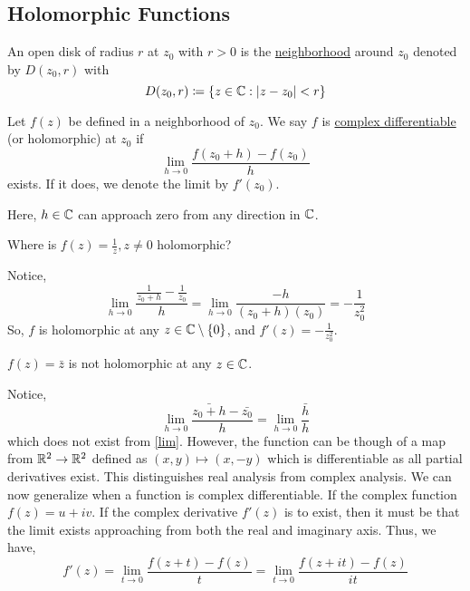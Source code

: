 \documentclass[11pt]{article}
\begin{document}
\subsection{Holomorphic Functions}
\begin{definition}
An open disk of radius $r$ at $z_0$ with $r>0$ is the \underline{neighborhood}
around $z_0$ denoted by $D(z_0, r)$ with
\begin{equation*}
D(z_0, r) \coloneqq \{z\in\mathbb{C}:|z-z_0|<r\}
\end{equation*}
\end{definition}
\begin{definition}
Let $f(z)$ be defined in a neighborhood of $z_0$. We say $f$ is
\underline{complex differentiable} (or holomorphic) at $z_0$ if
\begin{equation*}
\lim_{h\to 0} \frac{f(z_0+h) - f(z_0)}{h}
\end{equation*}
exists. If it does, we denote the limit by $f'(z_0)$.
\end{definition}
\begin{remark}
Here, $h\in\mathbb{C}$ can approach zero from any direction in $\mathbb{C}$.
\end{remark}
\begin{example}
Where is $f(z) = \frac{1}{z}, z \neq 0$ holomorphic?
\end{example}
Notice,
\begin{equation*}
\lim_{h\to 0} \frac{\frac{1}{z_0+h} - \frac{1}{z_0}}{h}
= \lim_{h\to 0} \frac{-h}{(z_0+h)(z_0)}
= -\frac{1}{z_0^2}
\end{equation*}
So, $f$ is holomorphic at any $z \in \mathbb{C} \setminus \{0\}$, and $f'(z) =
-\frac{1}{z_0^2}$.
\begin{example}
$f(z) = \bar z$ is not holomorphic at any $z \in \mathbb{C}$.
\end{example}
Notice,
\begin{equation*}
\lim_{h\to 0} \frac{\bar{z_0 + h} - \bar{z_0}}{h}
= \lim_{h \to 0} \frac{\bar h}{h}
\end{equation*}
which does not exist from \cref{lim}. However, the function can be though of a
map from $\mathbb{R}^2 \to \mathbb{R}^2$ defined as $(x,y) \mapsto (x,-y)$ which is
differentiable as all partial derivatives exist. This distinguishes real
analysis from complex analysis.
\sectionline
We can now generalize when a function is complex differentiable. If the complex
function $f(z) = u + iv$. If the complex derivative $f'(z)$ is to exist, then it
must be that the limit exists approaching from both the real and imaginary
axis. Thus, we have,
\begin{equation*}
f'(z)  = \lim_{t\to 0} \frac{f(z+t) - f(z)}{t} = \lim_{t\to 0} \frac{f(z+it) -
f(z)}{it}
\end{equation*}
\end{document}
